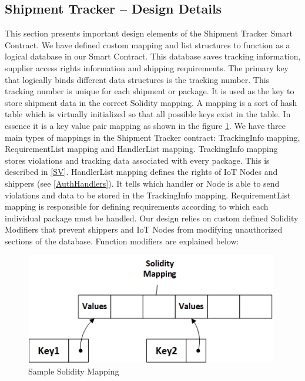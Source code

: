 
\subsection{Shipment Tracker – Design Details} \label{ST-SmartContract} 
This section presents important design elements of the Shipment Tracker Smart Contract. We have defined custom mapping and list structures to function as a logical database in our Smart Contract. This database saves tracking information, supplier access rights information and shipping requirements. The primary key that logically binds different data structures is the tracking number. This tracking number is unique for each shipment or package. It is used as the key to store shipment data in the correct Solidity mapping. A mapping is a sort of hash table which is virtually initialized so that all possible keys exist in the table. In essence it is a key value pair mapping as shown in the figure \ref{fig:Sol-Mapping}. We have three main types of mappings in the Shipment Tracker contract: TrackingInfo mapping, RequirementList mapping and HandlerList mapping. TrackingInfo mapping stores violations and tracking data associated with every package. This is described in \ref{SV}. HandlerList mapping defines the rights of IoT Nodes and shippers (see \ref{AuthHandlers}). It tells which handler or Node is able to send violations and data to be stored in the TrackingInfo mapping. RequirementList mapping is responsible for defining requirements according to which each individual package must be handled. Our design relies on custom defined Solidity Modifiers that prevent shippers and IoT Nodes from modifying unauthorized sections of the database. Function modifiers are explained below:

\begin{figure}[h]
	\centering
    \includegraphics[width=110mm,scale=1]{figs/Sol-Mapping}
	\caption{Sample Solidity Mapping}
	\label{fig:Sol-Mapping} 
\end{figure}


